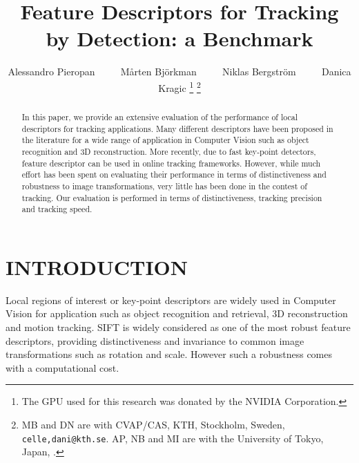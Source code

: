 \documentclass[letterpaper, 10pt, conference]{ieeeconf}
\title{\LARGE \bf Feature Descriptors for Tracking by Detection: a Benchmark}
\author{Alessandro Pieropan ~~~~ Mårten Bj{\"o}rkman  ~~~~ Niklas Bergstr{\"o}m ~~~~ Danica Kragic%
\thanks{The GPU used for this research was donated by the NVIDIA Corporation.}
\thanks{MB and DN are with CVAP/CAS, KTH, Stockholm, Sweden, {\tt celle,dani@kth.se}. AP, NB and MI are with the University of Tokyo, Japan, {\tt }.}}
\begin{document}
                                                                
                                                                                
\maketitle                                                                      
\thispagestyle{empty}                                                           
\pagestyle{empty}



\begin{abstract}
In this paper, we provide an extensive evaluation of the performance of local descriptors for tracking applications.
Many different descriptors have been proposed in the literature for a wide range of application in Computer Vision such as object recognition and 3D reconstruction. More recently, due to fast key-point detectors, feature descriptor can be used in online tracking frameworks. However, while much effort has been spent on evaluating their performance in terms of distinctiveness and robustness to image transformations, very little has been done in the contest of tracking. Our evaluation is performed in terms of distinctiveness, tracking precision and tracking speed. 

\end{abstract}

\section{INTRODUCTION}
\label{sec:introduction}



Local regions of interest or key-point descriptors are widely used in Computer Vision for application such as object recognition and retrieval, 3D reconstruction and motion tracking. SIFT \cite{lowe04} is widely considered as one of the most robust feature descriptors, providing distinctiveness and invariance to common image transformations such as rotation and scale. However such a robustness comes with a computational cost. 
\end{document}
